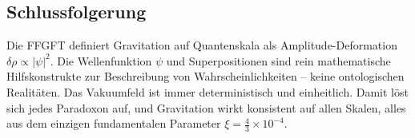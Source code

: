 	\subsection*{Schlussfolgerung}
	
	Die FFGFT definiert Gravitation auf Quantenskala als Amplitude-Deformation \(\delta \rho \propto |\psi|^2\). Die Wellenfunktion \(\psi\) und Superpositionen sind rein mathematische Hilfskonstrukte zur Beschreibung von Wahrscheinlichkeiten – keine ontologischen Realitäten. Das Vakuumfeld ist immer deterministisch und einheitlich. Damit löst sich jedes Paradoxon auf, und Gravitation wirkt konsistent auf allen Skalen, alles aus dem einzigen fundamentalen Parameter \(\xi = \frac{4}{3} \times 10^{-4}\).




